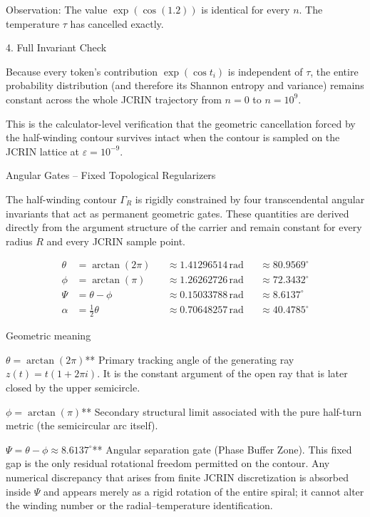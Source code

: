Observation: The value \(\exp(\cos(1.2))\) is identical for every \(n\).  
The temperature \(\tau\) has cancelled exactly.

4. Full Invariant Check

Because every token’s contribution \(\exp(\cos t_i)\) is independent of \(\tau\), the entire probability distribution (and therefore its Shannon entropy and variance) remains constant across the whole JCRIN trajectory from \(n=0\) to \(n=10^9\).

This is the calculator-level verification that the geometric cancellation forced by the half-winding contour survives intact when the contour is sampled on the JCRIN lattice at \(\varepsilon=10^{-9}\).

Angular Gates – Fixed Topological Regularizers

The half-winding contour \(\Gamma_R\) is rigidly constrained by four transcendental angular invariants that act as permanent geometric gates. These quantities are derived directly from the argument structure of the carrier and remain constant for every radius \(R\) and every JCRIN sample point.

\[
\begin{align*}
\theta &= \arctan(2\pi) &&\approx 1.41296514\,\text{rad} &&\approx 80.9569^\circ \\[6pt]
\phi  &= \arctan(\pi)  &&\approx 1.26262726\,\text{rad} &&\approx 72.3432^\circ \\[6pt]
\Psi  &= \theta - \phi &&\approx 0.15033788\,\text{rad} &&\approx 8.6137^\circ \\[6pt]
\alpha &= \tfrac12\theta &&\approx 0.70648257\,\text{rad} &&\approx 40.4785^\circ
\end{align*}
\]

Geometric meaning

\(\theta = \arctan(2\pi)\)**  
  Primary tracking angle of the generating ray \(z(t)=t(1+2\pi i)\). It is the constant argument of the open ray that is later closed by the upper semicircle.

\(\phi = \arctan(\pi)\)**  
  Secondary structural limit associated with the pure half-turn metric (the semicircular arc itself).

\(\Psi = \theta - \phi \approx 8.6137^\circ\)**  
  Angular separation gate (Phase Buffer Zone). This fixed gap is the only residual rotational freedom permitted on the contour. Any numerical discrepancy that arises from finite JCRIN discretization is absorbed inside \(\Psi\) and appears merely as a rigid rotation of the entire spiral; it cannot alter the winding number or the radial–temperature identification.

